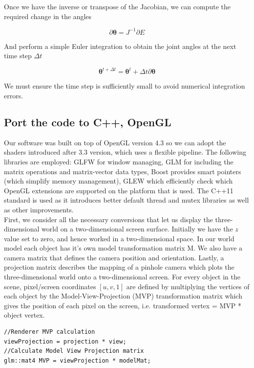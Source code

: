 \documentclass[paper=a4, fontsize=11pt]{scrartcl} %
\numberwithin{equation}{section} %
\numberwithin{figure}{section} %
\numberwithin{table}{section} %
\newcommand{\params}{\boldsymbol{\theta}}
\begin{document}
Once we have the inverse or transpose of the Jacobian, we can compute the required change in the angles

\begin{equation}
\partial \params = J^{-1} \partial E
\end{equation}

And perform a simple Euler integration to obtain the joint angles at the next time step $\Delta t$

\begin{equation}
\params^{t+\Delta t} = \params^t + \Delta t \partial \params
\end{equation}

We must ensure the time step is sufficiently small to avoid numerical integration errors.
 
\subsection{ Port the code to C++, OpenGL}
Our software was built on top of OpenGL version 4.3 so we can adopt the shaders introduced after 3.3 version, which uses a flexible pipeline. The following libraries are employed: GLFW for window managing, GLM  for including the matrix operations and matrix-vector data types, Boost provides smart pointers (which simplify memory management), GLEW which efficiently check which OpenGL extensions are supported on the platform that is used. The C++11 standard is used as it introduces better default thread and mutex libraries as well as other improvements. \\

First, we consider all the necessary conversions that let us display the three-dimensional world on a two-dimensional screen surface. Initially we have the \(z\) value set to zero, and hence worked in a two-dimensional space. In our world model each object has it's own model transformation matrix M. We also have a camera matrix that defines the camera position and orientation. Lastly, a projection matrix describes the mapping of a pinhole camera which plots the three-dimensional world onto a two-dimensional screen. For every object in the scene, pixel/screen coordinates \([u, v, 1]\) are defined by multiplying the vertices of each object by the Model-View-Projection (MVP) transformation matrix which gives the position of each pixel on the screen, i.e. transformed vertex = MVP *  object vertex. \\

\begin{mdframed}
\begin{scriptsize}
\begin{lstlisting}
//Renderer MVP calculation
viewProjection = projection * view;
//Calculate Model View Projection matrix
glm::mat4 MVP = viewProjection * modelMat;
\end{lstlisting}
\end{scriptsize}
\end{mdframed}
\end{document}
